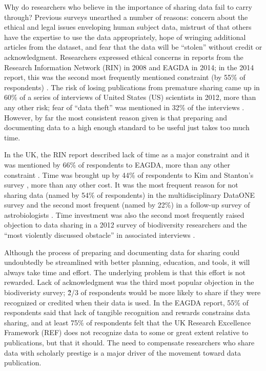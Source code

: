 \documentclass[10pt]{article}
\begin{document}
Why do researchers who believe in the importance of sharing data fail to carry through?
Previous surveys unearthed a number of reasons: concern about the ethical and legal issues enveloping human subject data, mistrust of that others have the expertise to use the data appropriately, hope of wringing additional articles from the dataset, and fear that the data will be ``stolen'' without credit or acknowledgment.
Researchers expressed ethical concerns in reports from the Research Information Network (RIN) in 2008 and EAGDA in 2014; in the 2014 report, this was the second most frequently mentioned constraint (by 55\% of respondents) \cite{swan_share_2008, bobrow_establishing_2014}.
The risk of losing publications from premature sharing came up in 60\% of a series of interviews of United States (US) scientists in 2012, more than any other risk; fear of ``data theft'' was mentioned in 32\% of the interviews \cite{kim_institutional_2012}.
However, by far the most consistent reason given is that preparing and documenting data to a high enough standard to be useful just takes too much time.

In the UK, the RIN report described lack of time as a major constraint \cite{swan_share_2008} and it was mentioned by 66\% of respondents to EAGDA, more than any other constraint \cite{bobrow_establishing_2014}.
Time was brought up by 44\% of respondents to Kim and Stanton's survey \cite{kim_institutional_2012}, more than any other cost.
It was the most frequent reason for not sharing data (named by 54\% of respondents) in the multidisciplinary DataONE survey  \cite{tenopir_data_2011} and the second most frequent (named by 22\%) in a follow-up survey of astrobiologists \cite{aydinoglu_data_2014}.
Time investment was also the second most frequently raised objection to data sharing in a 2012 survey of biodiversity researchers and the ``most violently discussed obstacle'' in associated interviews \cite{enke_users_2012}.

Although the process of preparing and documenting data for sharing could undoubtedly be streamlined with better planning, education, and tools, it will always take time and effort.
The underlying problem is that this effort is not rewarded.
Lack of acknowledgment was the third most popular objection in the biodiveristy survey; \~2/3 of respondents would be more likely to share if they were recognized or credited when their data is used.
In the EAGDA report, 55\% of respondents said that lack of tangible recognition and rewards constrains data sharing, and at least 75\% of respondents felt that the UK Research Excellence Framework (REF) does not recognize data to some or great extent relative to publications, but that it should.
The need to compensate researchers who share data with scholarly prestige is a major driver of the movement toward data publication.
 
\end{document}
